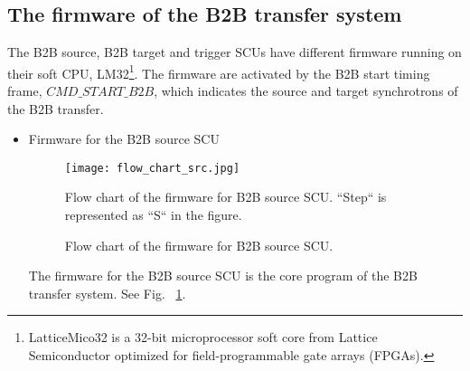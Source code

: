 \subsection{The firmware of the B2B transfer system}

The B2B source, B2B target and trigger SCUs have different firmware running on their soft \gls{CPU}, LM32\footnote{LatticeMico32 is a 32-bit microprocessor soft core from Lattice Semiconductor optimized for field-programmable gate arrays (\gls{FPGA}s).}. The firmware are activated by the  B2B start timing frame, $CMD\_START\_B2B$, which indicates the source and target synchrotrons of the B2B transfer. 
\begin{itemize}
\item Firmware for the B2B source SCU
\begin{figure}[!htb]
   \centering   
   \texttt{[image: flow\_chart\_src.jpg]}
   \caption{Flow chart of the firmware for B2B source SCU.}{Flow chart of the firmware for B2B source SCU. ``Step`` is represented as ``S`` in the figure.}
   \label{flow_chart_src}
\end{figure}

The firmware for the B2B source SCU is the core program of the B2B transfer system. See Fig. ~\ref{flow_chart_src}. 


\end{itemize}
